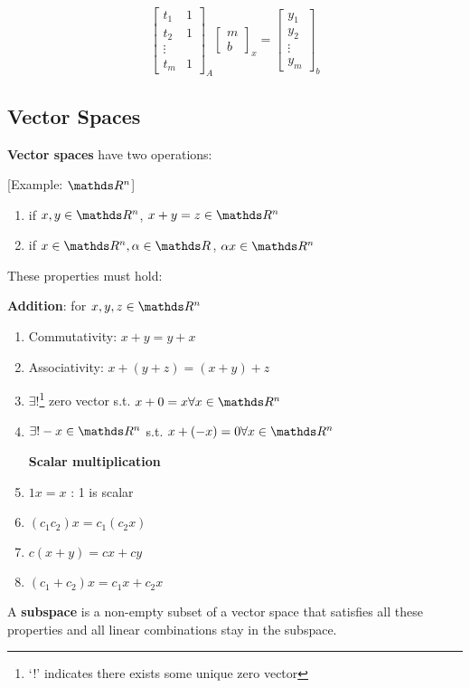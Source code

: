 \[
	\begin{bmatrix}
		t_1 & 1\\
		t_2 & 1\\
		\vdots \\
		t_m & 1
	\end{bmatrix}_A
	\begin{bmatrix}
		m \\ b
	\end{bmatrix}_x =
	\begin{bmatrix}
		y_1 \\ y_2 \\ \vdots \\ y_m
	\end{bmatrix}_b
\]

\subsection{Vector Spaces}
\textbf{Vector spaces} have two operations:

[Example: $\bbR^n$]

\begin{enumerate}
	\item if $x,y \in \bbR^n$, $x+ y = z \in \bbR^n$
	\item if $x \in \bbR^n, \alpha \in \bbR$, $\alpha x \in \bbR^n$
\end{enumerate}

These properties must hold:

\textbf{Addition}: for $x, y, z \in \bbR^n$
\begin{enumerate}
	\item Commutativity: $x + y = y + x$
	\item Associativity: $x + (y + z) = (x + y) + z$
	\item $\exists!$\footnote{`!' indicates there exists some unique zero vector} zero vector s.t. $x + 0 = x \forall x \in \bbR^n$
	\item $\exists! -x \in \bbR^n$ s.t. $x + (-x) = 0 \forall x \in \bbR^n$

	\textbf{Scalar multiplication}

	\item $1 x = x$ : 1 is scalar
	\item $(c_1 c_2) x = c_1(c_2x)$
	\item $c(x+y) = cx + cy$
	\item $(c_1 + c_2)x = c_1 x + c_2 x$
\end{enumerate}

A \textbf{subspace} is a non-empty subset of a vector space that satisfies all these properties and all linear combinations stay in the subspace.

